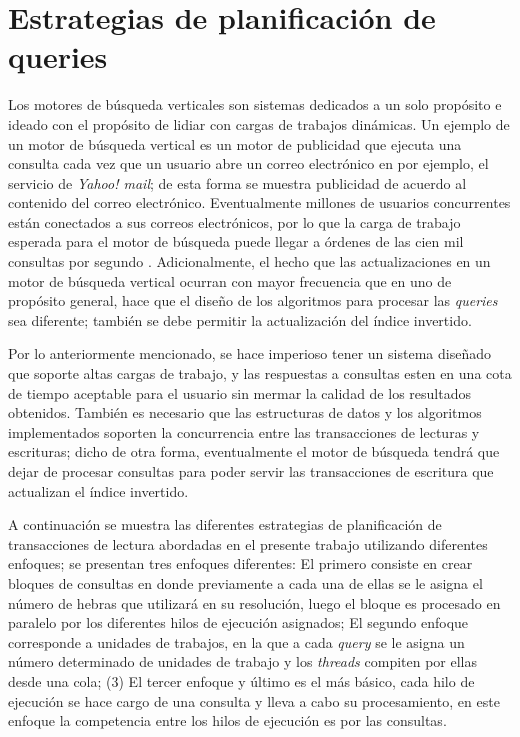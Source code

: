 \chapter{Estrategias de planificación de queries}
\label{cap:planificacion}
Los motores de búsqueda verticales son sistemas dedicados a un solo propósito e ideado con el propósito de lidiar con cargas de trabajos dinámicas. Un ejemplo de un motor de búsqueda vertical es un motor de publicidad que ejecuta una consulta cada vez que un usuario abre un correo electrónico en por ejemplo, el servicio de \textit{Yahoo! mail}; de esta forma se muestra publicidad de acuerdo al contenido del correo electrónico. Eventualmente millones de usuarios concurrentes están conectados a sus correos electrónicos, por lo que la carga de trabajo esperada para el motor de búsqueda puede llegar a órdenes de las cien mil consultas por segundo \citep{Gil-Costa:2013}. Adicionalmente, el hecho que las actualizaciones en un motor de búsqueda vertical ocurran con mayor frecuencia que en uno de propósito general, hace que el diseño de los algoritmos para procesar las \textit{queries} sea diferente; también se debe permitir la actualización del índice invertido.

Por lo anteriormente mencionado, se hace imperioso tener un sistema diseñado que soporte altas cargas de trabajo, y las respuestas a consultas esten en una cota de tiempo aceptable para el usuario sin mermar la calidad de los resultados obtenidos. También es necesario que las estructuras de datos y los algoritmos implementados soporten la concurrencia entre las transacciones de lecturas y escrituras; dicho de otra forma, eventualmente el motor de búsqueda tendrá que dejar de procesar consultas para poder servir las transacciones de escritura que actualizan el índice invertido.

A continuación se muestra las diferentes estrategias de planificación de transacciones de lectura abordadas en el presente trabajo utilizando diferentes enfoques; se presentan tres enfoques diferentes: El primero consiste en crear bloques de consultas en donde previamente a cada una de ellas se le asigna el número de hebras que utilizará en su resolución, luego el bloque es procesado en paralelo por los diferentes hilos de ejecución asignados; El segundo enfoque corresponde a unidades de trabajos, en la que a cada \textit{query} se le asigna un número determinado de unidades de trabajo y los \textit{threads} compiten por ellas desde una cola; (3) El tercer enfoque y último es el más básico, cada hilo de ejecución se hace cargo de una consulta y lleva a cabo su procesamiento, en este enfoque la competencia entre los hilos de ejecución es por las consultas. 

